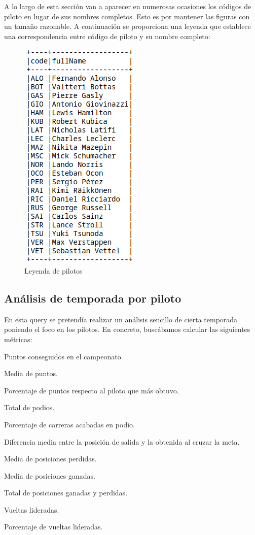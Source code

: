 \documentclass[12pt,twoside,titlepage]{report}
\begin{document}
A lo largo de esta sección van a aparecer en numerosas ocasiones los códigos de piloto en lugar de sus nombres completos. Esto es por mantener las figuras con un tamaño razonable. A continuación se proporciona una leyenda que establece una correspondencia entre código de piloto y su nombre completo:

\begin{figure}[H]
	\includegraphics[scale=0.4]{leyendapilotos.png}
	\centering
	\caption{Leyenda de pilotos}
	\label{fig:leyendapilotos}
	\centering
\end{figure}


\subsection{Análisis de temporada por piloto}

En esta query se pretendía realizar un análisis sencillo de cierta temporada poniendo el foco en los pilotos. En concreto, buscábamos calcular las siguientes métricas:

\begin{compactitem}
	\item Puntos conseguidos en el campeonato.
	\item Media de puntos.
	\item Porcentaje de puntos respecto al piloto que más obtuvo.
	\item Total de podios.
	\item Porcentaje de carreras acabadas en podio.
	\item Diferencia media entre la posición de salida y la obtenida al cruzar la meta.
	\item Media de posiciones perdidas.
	\item Media de posiciones ganadas.
	\item Total de posiciones ganadas y perdidas.
	\item Vueltas lideradas.
	\item Porcentaje de vueltas lideradas.
\end{compactitem}
\end{document}
